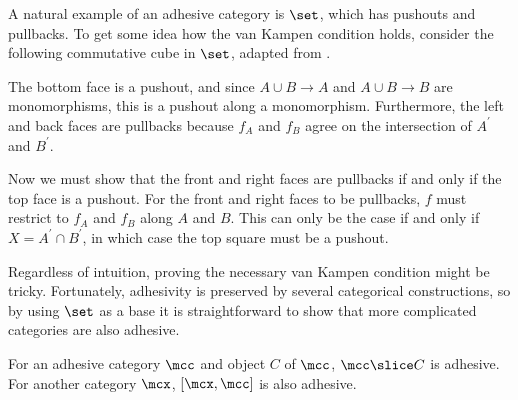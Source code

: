 \begin{example}
    A natural example of an adhesive category is \(\set\), which has pushouts
    and pullbacks.
    To get some idea how the van Kampen condition holds, consider the
    following commutative cube in \(\set\), adapted from
    \cite[Sec. 4.3]{kissinger2012pictures}.
    \begin{center}
    \end{center}
    The bottom face is a pushout, and since \(A \cup B \to A\) and
    \(A \cup B \to B\) are monomorphisms, this is a pushout along a
    monomorphism.
    Furthermore, the left and back faces are pullbacks because \(f_A\) and
    \(f_B\) agree on the intersection of \(A^\prime\) and \(B^\prime\).

    Now we must show that the front and right faces are pullbacks if and only if
    the top face is a pushout.
    For the front and right faces to be pullbacks, \(f\) must restrict to
    \(f_A\) and \(f_B\) along \(A\) and \(B\).
    This can only be the case if and only if \(X = A^\prime \cap B^\prime\), in
    which case the top square must be a pushout.
\end{example}

Regardless of intuition, proving the necessary van Kampen condition might be
tricky.
Fortunately, adhesivity is preserved by several categorical constructions, so
by using \(\set\) as a base it is straightforward to show that more complicated
categories are also adhesive.

\begin{proposition}
    For an adhesive category \(\mcc\) and object \(C\) of \(\mcc\),
    \(\mcc \slice C\) is adhesive.
    For another category \(\mcx\), \([\mcx, \mcc]\) is also adhesive.
\end{proposition}


